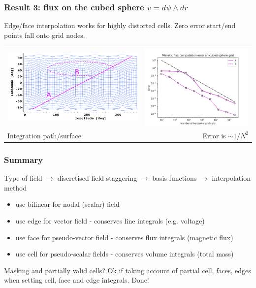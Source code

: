 \documentclass[aspectratio=169]{beamer}
\begin{document}
\begin{frame}[t]
  \frametitle{Result 3: flux on the cubed sphere $v = d\psi \wedge dr$}
  \begin{block}{Edge/face interpolation works for highly distorted cells. Zero error start/end points fall onto grid nodes.}
  \end{block}
  
  \begin{tabular}{lr}
  \includegraphics[width=75mm]{fluxOnCubedSphere.png} & 
  \includegraphics[width=60mm]{cubedSphereFluxError.png} \\
  {Integration path/surface} & {Error is $\sim 1/N^2$} 
  \end{tabular}
\end{frame}

\begin{frame}[t]
  \frametitle{Summary}
    \begin{block}{Type of field $\rightarrow$ discretised field staggering $\rightarrow$ basis functions $\rightarrow$ interpolation method}
      \begin{itemize}%
	  \item use bilinear for nodal (scalar) field
	  \item use {\color{red} edge} for vector field - conserves line integrals (e.g. voltage)
	  \item use {\color{red} face} for pseudo-vector field - conserves flux integrals (magnetic flux)
	  \item use cell for pseudo-scalar fields - conserves volume integrals (total mass)
    \end{itemize}
    \end{block}
    \begin{block}{Masking and partially valid cells?}
	 Ok if taking account of partial cell, faces, edges when setting cell, face and edge integrals. Done!
  \end{block}
\end{frame}
\end{document}
